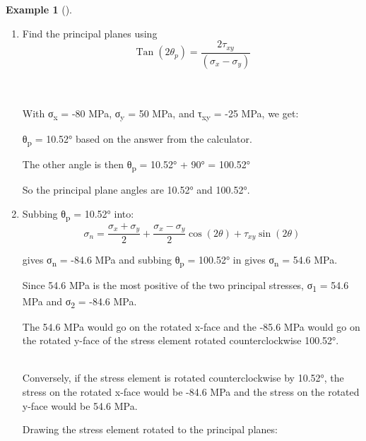 \documentclass[
  letterpaper,
  DIV=11,
  numbers=noendperiod]{scrreprt}
\theoremstyle{definition}
\newtheorem{example}{Example}[chapter]
\theoremstyle{remark}
\begin{document}
\begin{tcolorbox}
\begin{example}[]
\begin{tcolorbox}
\begin{enumerate}
\def\labelenumi{\arabic{enumi}.}
\item
  Find the principal planes using\\
  \[
  \operatorname{Tan}\left(2 \theta_p\right)=\frac{2 \tau_{x y}}{\left(\sigma_x-\sigma_y\right)}
  \]\\
  \strut \\
  With σ\textsubscript{x} = -80 MPa, σ\textsubscript{y} = 50 MPa, and
  τ\textsubscript{xy} = -25 MPa, we get:

  θ\textsubscript{p} = 10.52° based on the answer from the calculator.

  The other angle is then θ\textsubscript{p} = 10.52° + 90° = 100.52°

  So the principal plane angles are 10.52° and 100.52°.
\item
  Subbing θ\textsubscript{p} = 10.52° into:\\
  \[
  \sigma_n=\frac{\sigma_x+\sigma_y}{2}+\frac{\sigma_x-\sigma_y}{2} \cos (2 \theta)+\tau_{x y} \sin (2 \theta)
  \]

  gives σ\textsubscript{n} = -84.6 MPa and subbing θ\textsubscript{p} =
  100.52° in gives σ\textsubscript{n} = 54.6 MPa.

  Since 54.6 MPa is the most positive of the two principal stresses,
  σ\textsubscript{1} = 54.6 MPa and σ\textsubscript{2} = -84.6 MPa.

  The 54.6 MPa would go on the rotated x-face and the -85.6 MPa would go
  on the rotated y-face of the stress element rotated counterclockwise
  100.52°.\\
  \strut \\
  Conversely, if the stress element is rotated counterclockwise by
  10.52°, the stress on the rotated x-face would be -84.6 MPa and the
  stress on the rotated y-face would be 54.6 MPa.

  Drawing the stress element rotated to the principal planes:


\end{enumerate}
\end{tcolorbox}
\end{example}
\end{tcolorbox}
\end{document}
